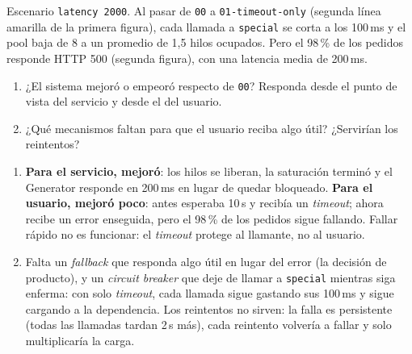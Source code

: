 \documentclass[variant=guia,cover=institutional,mode=screen]{ua-engineering-v6-article}
\begin{document}
\begin{uaexercise}
Escenario \texttt{latency 2000}. Al pasar de \texttt{00} a \texttt{01-timeout-only} (segunda línea amarilla de la primera figura), cada llamada a \texttt{special} se corta a los 100\,ms y el pool baja de 8 a un promedio de 1,5 hilos ocupados. Pero el 98\,\% de los pedidos responde HTTP 500 (segunda figura), con una latencia media de 200\,ms.
\begin{enumerate}
\item ¿El sistema mejoró o empeoró respecto de \texttt{00}? Responda desde el punto de vista del servicio y desde el del usuario.
\item ¿Qué mecanismos faltan para que el usuario reciba algo útil? ¿Servirían los reintentos?
\end{enumerate}
\end{uaexercise}
\begin{uaanswer}
\begin{enumerate}
\item \textbf{Para el servicio, mejoró}: los hilos se liberan, la saturación terminó y el Generator responde en 200\,ms en lugar de quedar bloqueado. \textbf{Para el usuario, mejoró poco}: antes esperaba 10\,s y recibía un \emph{timeout}; ahora recibe un error enseguida, pero el 98\,\% de los pedidos sigue fallando. Fallar rápido no es funcionar: el \emph{timeout} protege al llamante, no al usuario.
\item Falta un \emph{fallback} que responda algo útil en lugar del error (la decisión de producto), y un \emph{circuit breaker} que deje de llamar a \texttt{special} mientras siga enferma: con solo \emph{timeout}, cada llamada sigue gastando sus 100\,ms y sigue cargando a la dependencia. Los reintentos no sirven: la falla es persistente (todas las llamadas tardan 2\,s más), cada reintento volvería a fallar y solo multiplicaría la carga.
\end{enumerate}
\end{uaanswer}
\end{document}
